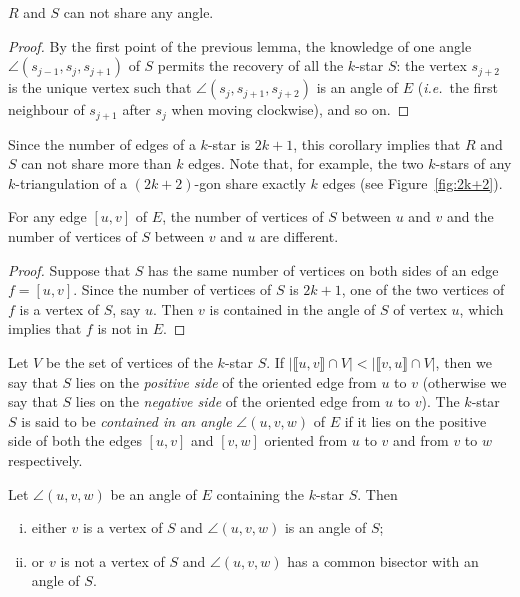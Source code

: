 \documentclass[12pt]{amsart}
\begin{document}
\begin{corollary}
$R$ and $S$ can not share any angle.
\end{corollary}

\begin{proof}
By the first point of the previous lemma, the knowledge of one angle $\angle(s_{j-1},s_j,s_{j+1})$ of $S$ permits the recovery of all the $k$-star $S$: the vertex $s_{j+2}$ is the unique vertex such that $\angle(s_j,s_{j+1},s_{j+2})$ is an angle of $E$ ({\it i.e.}~the first neighbour of $s_{j+1}$ after $s_j$ when moving clockwise), and so on.
\end{proof}

Since the number of edges of a $k$-star is $2k+1$, this corollary implies that $R$ and $S$ can not share more than $k$ edges. Note that, for example, the two $k$-stars of any $k$-triangulation of a $(2k+2)$-gon share exactly $k$ edges (see Figure~\ref{fig:2k+2}).

\begin{corollary}
For any edge $[u,v]$ of $E$, the number  of vertices of $S$ between $u$ and $v$ and the number  of vertices of $S$ between $v$ and $u$ are different.
\end{corollary}

\begin{proof}
Suppose that $S$ has the same number of vertices on both sides of an edge $f=[u,v]$. Since the number of vertices of $S$ is $2k+1$, one of the two vertices of $f$ is a vertex of $S$, say $u$. Then $v$ is contained in the angle of $S$ of vertex $u$, which implies that $f$ is not in $E$.
\end{proof}

Let $V$ be the set of vertices of the $k$-star $S$.
If $|\llbracket u,v\rrbracket\cap V|<|\llbracket v,u\rrbracket\cap V|$, then we say that $S$ lies on the \emph{positive side} of the oriented edge from $u$ to $v$ (otherwise we say that $S$ lies on the \emph{negative side} of the oriented edge from $u$ to $v$). 
The $k$-star $S$ is said to be \emph{contained in an angle} $\angle(u,v,w)$ of $E$ if it lies on the positive side of both the edges $[u,v]$ and $[v,w]$ oriented from $u$ to $v$ and from $v$ to $w$ respectively.


\begin{lemma}
Let $\angle(u,v,w)$ be an angle of $E$ containing the $k$-star $S$. Then
\begin{enumerate}[(i)]
\item either $v$ is a vertex of $S$ and $\angle(u,v,w)$ is an angle of $S$;
\item or $v$ is not a vertex of $S$ and $\angle(u,v,w)$ has a common bisector with an angle of $S$.
\end{enumerate}
\end{lemma}
\end{document}
